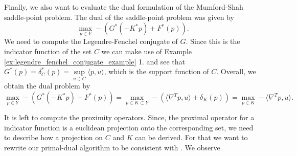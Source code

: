 	Finally, we also want to evaluate the dual formulation of the Mumford-Shah saddle-point problem. The dual of the saddle-point problem was given by
		$$
            \max_{p \in Y} -(G^{\ast}(-K^{\ast}p) + F^{\ast}(p)).
        $$
    We need to compute the Legendre-Fenchel conjugate of $G$. Since this is the indicator function of the set $C$ we can make use of Example \ref{ex:legendre_fenchel_conjugate_example} 1. and see that $G^{\ast}(p) = \delta^{\ast}_{C}(p) = \sup\limits_{u \in C} \langle p, u \rangle$, which is the support function of $C$. Overall, we obtain the dual problem by
    	\begin{equation}
    		\max_{p \in Y} -(G^{\ast}(-K^{\ast}p) + F^{\ast}(p)) = \max_{p \in K \subset Y} -(\langle \nabla^{T}p, u \rangle + \delta_{K}(p)) = \max_{p \in K} -\langle \nabla^{T}p, u \rangle.
    	\label{eq:dual_mumford_shah}
    	\end{equation}
    
    It is left to compute the proximity operators. Since, the proximal operator for a indicator function is a euclidean projection onto the corresponding set, we need to describe how a projection on $C$ and $K$ can be derived.
    For that we want to rewrite our primal-dual algorithm to be consistent with \cite{Pock-et-al-iccv09}. We observe


